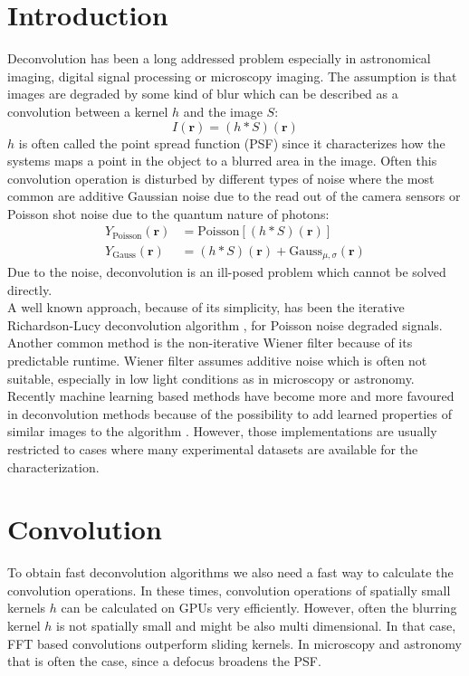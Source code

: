 \documentclass{juliacon}
\begin{document}
\section{Introduction}
Deconvolution has been a long addressed problem especially in astronomical imaging, digital signal processing or microscopy imaging.
The assumption is that images are degraded by some kind of blur which can be described as a convolution between a kernel $h$ and the image $S$:
\begin{equation}
    I(\mathbf r) = (h * S)(\mathbf r)
\end{equation}
$h$ is often called the point spread function (PSF) since it characterizes how the systems maps a point in the object to a blurred area
in the image.
Often this convolution operation is disturbed by different types of noise where the most common are additive Gaussian noise due to the read out of the camera sensors or Poisson shot noise due to the quantum nature of photons:
\begin{align}
    Y_{\text{Poisson}}(\mathbf r) &= \text{Poisson}[(h * S)(\mathbf r)]\\
    Y_{\text{Gauss}}(\mathbf r) &= (h * S)(\mathbf r) + \text{Gauss}_{\mu, \sigma}(\mathbf r)
\end{align}
Due to the noise, deconvolution is an ill-posed problem which cannot be solved directly.\\
A well known approach, because of its simplicity, has been the iterative Richardson-Lucy deconvolution algorithm \cite{Richardson:72}, \cite{lucy:74} for Poisson noise degraded signals.
Another common method is the non-iterative Wiener filter \cite{wiener2013extrapolation} because of its predictable runtime.
Wiener filter assumes additive noise which is often not suitable, especially in low light conditions as in microscopy or astronomy. 
Recently machine learning based methods have become more and more favoured in deconvolution methods because
of the possibility to add learned properties of similar images to the algorithm \cite{Kruse_2017_ICCV}.
However, those implementations are usually restricted to cases where many experimental datasets are available for the characterization.

\section{Convolution}
To obtain fast deconvolution algorithms we also need a fast way to calculate the convolution operations.
In these times, convolution operations of spatially small kernels $h$ can be calculated on GPUs very efficiently.
However, often the blurring kernel $h$ is not spatially small and might be also multi dimensional. In that case, FFT based convolutions
outperform sliding kernels. In microscopy and astronomy that is often the case, since a defocus broadens the PSF.
\end{document}

